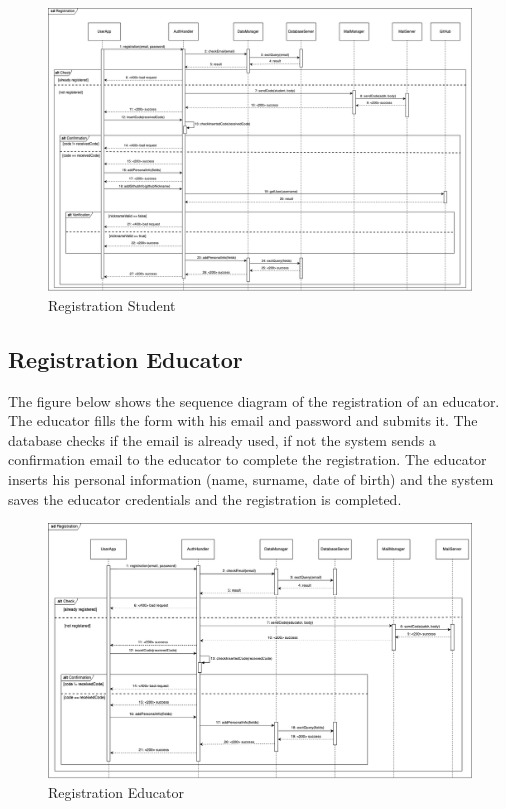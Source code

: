 \begin{figure}[H]
    \centering
    \includegraphics[width=1\textwidth]{images/seq_diagrams/RegistrationStd_DD.png}
    \caption{Registration Student}
\end{figure}
\clearpage

\subsection{Registration Educator}
The figure below shows the sequence diagram of the registration of an educator. The educator fills the form with his email and password and submits it. 
The database checks if the email is already used, if not the system sends a confirmation email to the educator to complete the registration. 
The educator inserts his personal information (name, surname, date of birth) and the system saves the educator credentials and the registration is completed.
\begin{figure}[H]
    \centering
    \includegraphics[width=1\textwidth]{images/seq_diagrams/RegistrationEd_DD.png}
    \caption{Registration Educator}
\end{figure}
\clearpage

